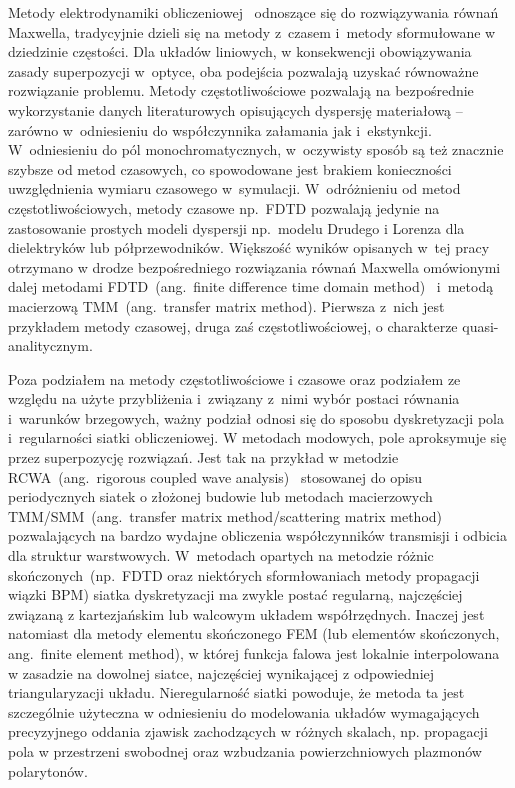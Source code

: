 Metody elektrodynamiki obliczeniowej~\cite{bondeson2005computational} odnoszące się do rozwiązywania równań Maxwella, tradycyjnie dzieli się na metody z~czasem i~metody sformułowane w dziedzinie częstości. Dla układów liniowych, w konsekwencji obowiązywania zasady superpozycji w~optyce, oba podejścia pozwalają uzyskać równoważne rozwiązanie problemu. Metody częstotliwościowe pozwalają na bezpośrednie wykorzystanie danych literaturowych opisujących dyspersję materiałową – zarówno w~odniesieniu do współczynnika załamania jak i~ekstynkcji. W~odniesieniu do pól monochromatycznych, w~oczywisty sposób są też znacznie szybsze od metod czasowych, co spowodowane jest brakiem konieczności uwzględnienia wymiaru czasowego w~symulacji. W~odróżnieniu od metod częstotliwościowych, metody czasowe np.~FDTD pozwalają jedynie na zastosowanie prostych modeli dyspersji np.~modelu Drudego i Lorenza dla dielektryków lub półprzewodników. Większość wyników opisanych w~tej pracy otrzymano w drodze bezpośredniego rozwiązania równań Maxwella omówionymi dalej metodami FDTD~(ang.~finite difference time domain method)~\cite{taflove1995computational} i~metodą macierzową TMM~(ang.~transfer matrix method). Pierwsza z~nich jest przykładem metody czasowej, druga zaś częstotliwościowej, o charakterze quasi-analitycznym. 

Poza podziałem na metody częstotliwościowe i czasowe oraz podziałem ze względu na użyte przybliżenia i~związany z~nimi wybór postaci równania i~warunków brzegowych, ważny podział odnosi się do sposobu dyskretyzacji pola i~regularności siatki obliczeniowej. W metodach modowych, pole aproksymuje się przez superpozycję rozwiązań. Jest tak na przykład w metodzie RCWA~(ang.~rigorous coupled wave analysis)~\cite{hench2008rcwa} stosowanej do opisu periodycznych siatek o złożonej budowie lub metodach macierzowych TMM/SMM~(ang.~transfer matrix method/scattering matrix method)~\cite{teich1991fundamentalsTMM,yeh2006} pozwalających na bardzo wydajne obliczenia współczynników transmisji i odbicia dla struktur warstwowych. W~metodach opartych na metodzie różnic skończonych~(np.~FDTD oraz niektórych sformłowaniach metody propagacji wiązki BPM) siatka dyskretyzacji ma zwykle postać regularną, najczęściej związaną z kartezjańskim lub walcowym układem współrzędnych. Inaczej jest natomiast dla metody elementu skończonego FEM (lub elementów skończonych, ang.~finite element method), w której funkcja falowa jest lokalnie interpolowana w zasadzie na dowolnej siatce, najczęściej wynikającej z odpowiedniej triangularyzacji układu. Nieregularność siatki powoduje, że metoda ta jest szczególnie użyteczna w odniesieniu do modelowania układów wymagających precyzyjnego oddania zjawisk zachodzących w różnych skalach, np. propagacji pola w przestrzeni swobodnej oraz wzbudzania powierzchniowych plazmonów polarytonów.

